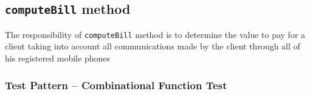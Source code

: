%
%
%
\subsection{\texttt{computeBill} method}
\label{sec:methods.computeBill}
The responsibility of \texttt{computeBill} method is to determine the value to
pay for a client taking into account all communications made by the client
through all of his registered mobile phones

\subsubsection{Test Pattern -- Combinational Function Test}
\label{sec:methods.computeBill.pattern}


